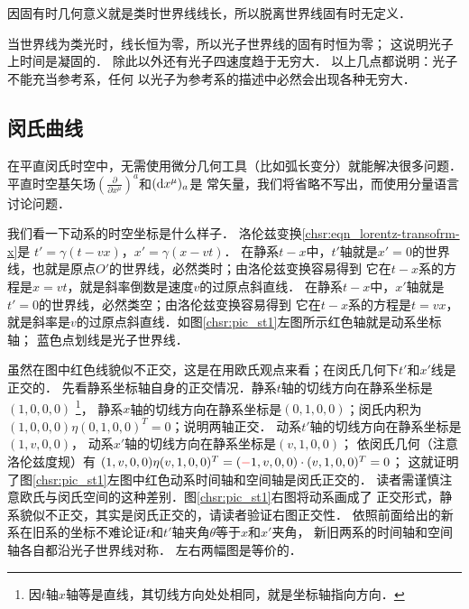 {\kaishu 因固有时几何意义就是类时世界线线长，所以脱离世界线固有时无定义．}

当世界线为类光时，线长恒为零，所以光子世界线的固有时恒为零；
这说明光子上时间是凝固的．
除此以外还有光子四速度趋于无穷大．
以上几点都说明：光子不能充当参考系，任何
以光子为参考系的描述中必然会出现各种无穷大．





\subsection{闵氏曲线}
在平直闵氏时空中，无需使用微分几何工具（比如弧长变分）就能解决很多问题．
平直时空基矢场$(\frac{\partial }{\partial x^\mu})^a$和$({\rm d}x^\mu)_a$是
常矢量，我们将省略不写出，而使用分量语言讨论问题．

我们看一下动系的时空坐标是什么样子．
洛伦兹变换\eqref{chsr:eqn_lorentz-transofrm-x}是
$t' = \gamma ({t-v x})$，$  x' = \gamma ({x-vt})$．
在静系$t-x$中，$t'$轴就是$x'=0$的世界线，也就是原点$O'$的世界线，必然类时；由洛伦兹变换容易得到
它在$t-x$系的方程是$x=vt$，就是斜率倒数是速度$v$的过原点斜直线．
在静系$t-x$中，$x'$轴就是$t'=0$的世界线，必然类空；由洛伦兹变换容易得到
它在$t-x$系的方程是$t=vx$，就是斜率是$v$的过原点斜直线．如图\ref{chsr:pic_st1}左图所示红色轴就是动系坐标轴；
蓝色点划线是光子世界线．

虽然在图中红色线貌似不正交，这是在用欧氏观点来看；在闵氏几何下$t'$和$x'$线是正交的．
先看静系坐标轴自身的正交情况．静系$t$轴的切线方向在静系坐标是$(1,0,0,0)$
{\footnote{因$t$轴$x$轴等是直线，其切线方向处处相同，就是坐标轴指向方向．}}，
静系$x$轴的切线方向在静系坐标是$(0,1,0,0)$；闵氏内积为
$(1,0,0,0) \eta  (0,1,0,0)^{T}=0$；说明两轴正交．
动系$t'$轴的切线方向在静系坐标是$(1,v,0,0)$，
动系$x'$轴的切线方向在静系坐标是$(v,1,0,0)$；
依闵氏几何（注意洛伦兹度规）有
$(1,v,0,0) \eta(v,1,0,0)^{T}=({\color{red}{\mathbf{-}}}1,v,0,0)\cdot(v,1,0,0)^{T}=0$；
这就证明了图\ref{chsr:pic_st1}左图中红色动系时间轴和空间轴是闵氏正交的．
读者需谨慎注意欧氏与闵氏空间的这种差别．图\ref{chsr:pic_st1}右图将动系画成了
正交形式，静系貌似不正交，其实是闵氏正交的，请读者验证右图正交性．
依照前面给出的新系在旧系的坐标不难论证$t$和$t'$轴夹角$\theta$等于$x$和$x'$夹角，
新旧两系的时间轴和空间轴各自都沿光子世界线对称．
左右两幅图是等价的．


